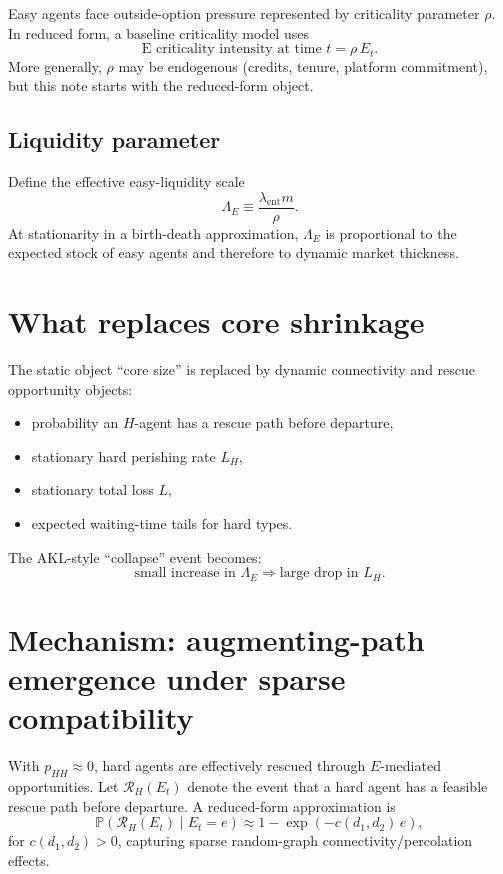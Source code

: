 \documentclass{article}
\newcommand{\PP}{\mathbb{P}}
\begin{document}
Easy agents face outside-option pressure represented by criticality parameter \(\rho\). In reduced form, a baseline criticality model uses
\[
\text{E criticality intensity at time }t = \rho\,E_t.
\]
More generally, \(\rho\) may be endogenous (credits, tenure, platform commitment), but this note starts with the reduced-form object.

\subsection{Liquidity parameter}

Define the effective easy-liquidity scale
\[
\Lambda_E \equiv \frac{\lambda_{\mathrm{ent}}m}{\rho}.
\]
At stationarity in a birth-death approximation, \(\Lambda_E\) is proportional to the expected stock of easy agents and therefore to dynamic market thickness.

\section{What replaces core shrinkage}

The static object ``core size'' is replaced by dynamic connectivity and rescue opportunity objects:
\begin{itemize}
  \item probability an \(H\)-agent has a rescue path before departure,
  \item stationary hard perishing rate \(L_H\),
  \item stationary total loss \(L\),
  \item expected waiting-time tails for hard types.
\end{itemize}

The AKL-style ``collapse'' event becomes:
\[
\text{small increase in }\Lambda_E \Rightarrow \text{large drop in }L_H.
\]

\section{Mechanism: augmenting-path emergence under sparse compatibility}

With \(p_{HH}\approx 0\), hard agents are effectively rescued through \(E\)-mediated opportunities. Let \(\mathcal{R}_H(E_t)\) denote the event that a hard agent has a feasible rescue path before departure. A reduced-form approximation is
\[
\PP(\mathcal{R}_H(E_t)\mid E_t=e)\approx 1-\exp(-c(d_1,d_2)\,e),
\]
for \(c(d_1,d_2)>0\), capturing sparse random-graph connectivity/percolation effects.
\end{document}
